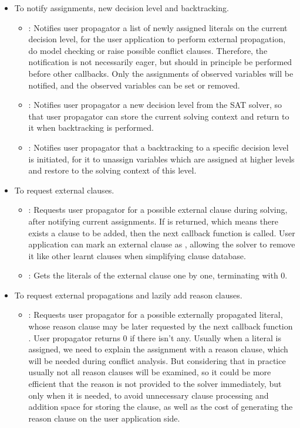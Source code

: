 \begin{itemize}
  \item To notify assignments, new decision level and backtracking.
    \begin{itemize}
      \item {}: Notifies user propagator a list of newly assigned literals on the current decision level, for the user application to perform external propagation, do model checking or raise possible conflict clauses. Therefore, the notification is not necessarily eager, but should in principle be performed before other callbacks. Only the assignments of observed variables will be notified, and the observed variables can be set or removed.
      \item {}: Notifies user propagator a new decision level from the SAT solver, so that user propagator can store the current solving context and return to it when backtracking is performed.
      \item {}: Notifies user propagator that a backtracking to a specific decision level is initiated, for it to unassign variables which are assigned at higher levels and restore to the solving context of this level.
    \end{itemize}
  \item To request external clauses.
    \begin{itemize}
      \item {}: Requests user propagator for a possible external clause during solving, after notifying current assignments. If  is returned, which means there exists a clause to be added, then the next callback function  is called. User application can mark an external clause as , allowing the solver to remove it like other learnt clauses when simplifying clause database.
      \item {}: Gets the literals of the external clause one by one, terminating with 0.  
    \end{itemize}
  \item To request external propagations and lazily add reason clauses.
    \begin{itemize}
      \item {}: Requests user propagator for a possible externally propagated literal, whose reason clause may be later requested by the next callback function . User propagator returns 0 if there isn't any. Usually when a literal is assigned, we need to explain the assignment with a reason clause, which will be needed during conflict analysis. But considering that in practice usually not all reason clauses will be examined, so it could be more efficient that the reason is not provided to the solver immediately, but only when it is needed, to avoid unnecessary clause processing and addition space for storing the clause, as well as the cost of generating the reason clause on the user application side.

\end{itemize}
\end{itemize}
